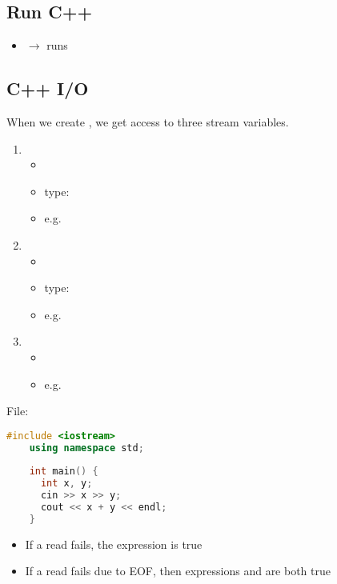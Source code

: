 \subsection{Run C++}
\begin{itemize}
    \item {} $ \rightarrow $ runs 
\end{itemize}

\subsection{C++ I/O}

When we create , we get access to three stream variables.
\begin{enumerate}
    \item {}
          \begin{itemize}
              \item {}
              \item type: 
              \item e.g. 
          \end{itemize}
    \item {}
          \begin{itemize}
              \item {}
              \item type: 
              \item e.g. 
          \end{itemize}
    \item {}
          \begin{itemize}
              \item {}
              \item e.g. 
          \end{itemize}
\end{enumerate}

File: 
\begin{lstlisting}[language = C++]
    #include <iostream>
    using namespace std;
    
    int main() {
      int x, y;
      cin >> x >> y;
      cout << x + y << endl;
    }
\end{lstlisting}
\begin{itemize}
    \item If a read fails, the expression  is true
    \item If a read fails due to EOF, then expressions 
          and  are both true
\end{itemize}

